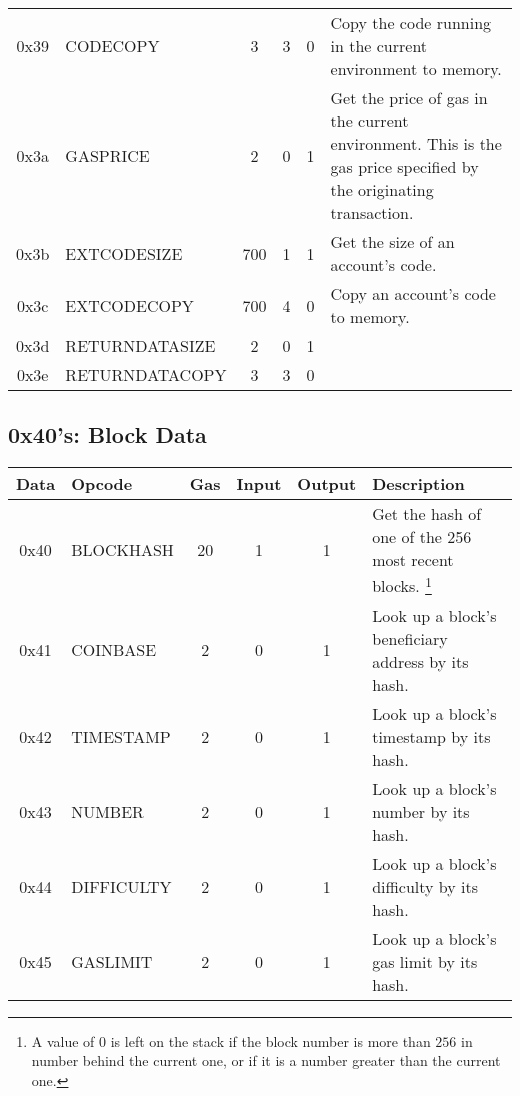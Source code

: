 \documentclass[10pt,a4paper,leqno,bibliography=totoc]{scrartcl}
\newenvironment{alphafootnotes}
{\par\edef\savedfootnotenumber{\number\value{footnote}}
\renewcommand{\thefootnote}{\alph{footnote}}
\setcounter{footnote}{0}}
{\par\setcounter{footnote}{\savedfootnotenumber}}
\begin{document}
\begin{alphafootnotes}
\begin{longtable}{|cP{2.8cm}cccp{6cm}|}
			0x39 & CODECOPY & 3 & 3 & 0 & Copy the code running in the current environment to memory. \\
			0x3a & GASPRICE & 2 & 0 & 1 & Get the price of gas in the current environment. This is the gas price specified by the originating transaction. \\
			0x3b & EXTCODESIZE & 700 & 1 & 1 & Get the size of an account's code. \\
			0x3c & EXTCODECOPY & 700 & 4 & 0 & Copy an account's code to memory. \\
			0x3d & RETURNDATASIZE & 2 & 0 & 1 & \\
			0x3e & RETURNDATACOPY & 3 & 3 & 0 & \\
			\hline
			\end{longtable}

	        \subsection{0x40's: Block Data}
			\begin{longtable}{|cP{2.8cm}cccp{6cm}|}
			\hline
			\textbf{Data} & \textbf{Opcode} & \textbf{Gas}  & \textbf{Input}  & \textbf{Output} & \textbf{Description} \\
			\hline
			0x40 & BLOCKHASH & 20 & 1 & 1 & Get the hash of one of the 256 most recent blocks. \footnote{A value of 0 is left on the stack if the block number is more than $256$ in number behind the current one, or if it is a number greater than the current one.} \\ 
			0x41 & COINBASE & 2 & 0 & 1 & Look up a block's beneficiary address by its hash.\\
			0x42 & TIMESTAMP & 2 & 0 & 1 & Look up a block's timestamp by its hash.\\
			0x43 & NUMBER & 2  & 0 & 1 & Look up a block's number by its hash. \\
			0x44 & DIFFICULTY & 2 & 0 & 1 & Look up a block's difficulty by its hash. \\
			0x45 & GASLIMIT & 2  & 0 & 1 & Look up a block's gas limit by its hash. \\
			\hline
			\end{longtable}


\end{alphafootnotes}
\end{document}
